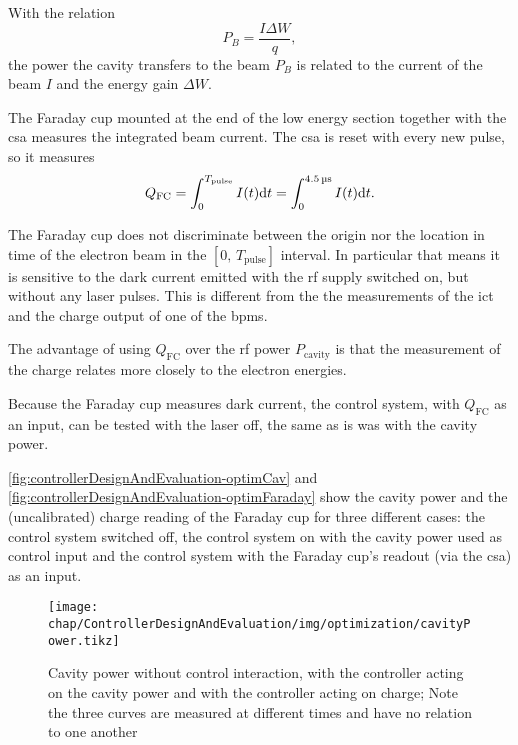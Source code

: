 With the relation
\begin{equation}
P_B = \frac{I \Delta W}{q},
\end{equation}
the power the cavity transfers to the beam $P_B$ is related to the current of the beam $I$ and the energy gain $\Delta W$. \cite[p.~43]{Wangler2008}

The Faraday cup mounted at the end of the low energy section together with the \gls{csa} measures the integrated beam current. The \gls{csa} is reset with every new pulse, so it measures
\begin{equation}
Q_\text{FC} = \int_{0}^{T_\text{pulse}} I(t) \text{d}{t} = \int_{0}^{\SI{4.5}{\micro\second}} I(t) \text{d}{t}.
\end{equation}

The Faraday cup does not discriminate between the origin nor the location in time of the electron beam in the $[0,\,T_\text{pulse}]$ interval. In particular that means it is sensitive to the dark current emitted with the \gls{rf} supply switched on, but without any laser pulses. This is different from the the measurements of the \gls{ict} and the charge output of one of the \glspl{bpm}. \cite{Nasse2019}

The advantage of using $Q_\text{FC}$ over the \gls{rf} power $P_\text{cavity}$ is that the measurement of the charge relates more closely to the electron energies.

Because the Faraday cup measures dark current, the control system, with $Q_\text{FC}$ as an input, can be tested with the laser off, the same as is was with the cavity power.

\autoref{fig:controllerDesignAndEvaluation-optimCav} and \autoref{fig:controllerDesignAndEvaluation-optimFaraday} show the cavity power and the (uncalibrated) charge reading of the Faraday cup for three different cases: the control system switched off, the control system on with the cavity power used as control input and the control system with the Faraday cup's readout (via the \gls{csa}) as an input.

\begin{figure}[tb]
	\centering
	\texttt{[image: chap/ControllerDesignAndEvaluation/img/optimization/cavityPower.tikz]}
	\caption{Cavity power without control interaction, with the controller acting on the cavity power and with the controller acting on charge; Note the three curves are measured at different times and have no relation to one another}
	\label{fig:controllerDesignAndEvaluation-optimCav}
\end{figure}


